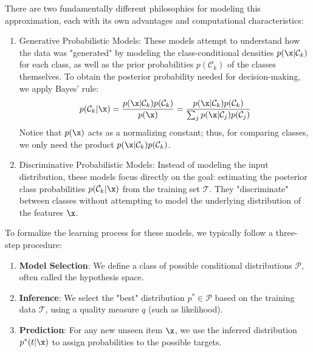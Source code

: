 There are two fundamentally different philosophies for modeling this approximation, each with its own advantages and computational characteristics:

\begin{enumerate}
    \item \alert{Generative Probabilistic Models}: These models attempt to understand how the data was "generated" by modeling the class-conditional densities $p(\x|{\mathcal{C}}_{k})$ for each class, as well as the prior probabilities $p({\mathcal{C}}_{k})$ of the classes themselves. To obtain the posterior probability needed for decision-making, we apply Bayes' rule:
    \begin{equation*}
    p({\mathcal{C}}_{k}|\x) = \frac{p(\x|{\mathcal{C}}_{k})p({\mathcal{C}}_{k})}{p(\x)} = \frac{p(\x|{\mathcal{C}}_{k})p({\mathcal{C}}_{k})}{\sum_j p(\x|{\mathcal{C}}_{j})p({\mathcal{C}}_{j})}
    \end{equation*}
    Notice that $p(\x)$ acts as a normalizing constant; thus, for comparing classes, we only need the product $p(\x|{\mathcal{C}}_{k})p({\mathcal{C}}_{k})$.
    
    \item \alert{Discriminative Probabilistic Models}: Instead of modeling the input distribution, these models focus directly on the goal: estimating the posterior class probabilities $p({\mathcal{C}}_{k}|\x)$ from the training set $\mathcal{T}$. They "discriminate" between classes without attempting to model the underlying distribution of the features $\x$.
\end{enumerate}



\medskip
To formalize the learning process for these models, we typically follow a three-step procedure:
\begin{enumerate}
    \item \textbf{Model Selection}: We define a class of possible conditional distributions $\mathcal{P}$, often called the hypothesis space.
    \item \textbf{Inference}: We select the "best" distribution $p^* \in \mathcal{P}$ based on the training data $\mathcal{T}$, using a quality measure $q$ (such as likelihood).
    \item \textbf{Prediction}: For any new unseen item $\x$, we use the inferred distribution $p^*(t|\x)$ to assign probabilities to the possible targets.
\end{enumerate}

